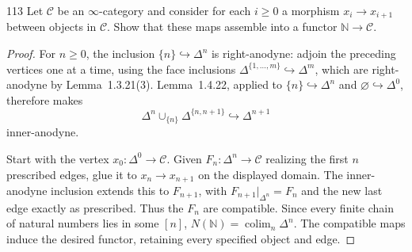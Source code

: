 \begin{exercise}{113}
Let $\mathcal C$ be an $\infty$-category and consider for each $i\ge0$ a morphism
$x_i\to x_{i+1}$ between objects in $\mathcal C$. Show that these maps assemble into a functor
$\mathbb N\to\mathcal C$.

\begin{proof}
For $n\ge0$, the inclusion $\{n\}\hookrightarrow\Delta^n$ is right-anodyne:
adjoin the preceding vertices one at a time, using the face inclusions
$\Delta^{\{1,\ldots,m\}}\hookrightarrow\Delta^m$, which are right-anodyne
by Lemma~1.3.21(3).
Lemma~1.4.22, applied to $\{n\}\hookrightarrow\Delta^n$ and
$\varnothing\hookrightarrow\Delta^0$, therefore makes
\[
 \Delta^n\cup_{\{n\}}\Delta^{\{n,n+1\}}
 \hookrightarrow\Delta^{n+1}
\]
inner-anodyne.

Start with the vertex $x_0\colon\Delta^0\to\mathcal C$.
Given $F_n\colon\Delta^n\to\mathcal C$ realizing the first $n$ prescribed
edges, glue it to $x_n\to x_{n+1}$ on the displayed domain.
The inner-anodyne inclusion extends this to $F_{n+1}$, with
$F_{n+1}|_{\Delta^n}=F_n$ and the new last edge exactly as prescribed.
Thus the $F_n$ are compatible.
Since every finite chain of natural numbers lies in some $[n]$,
$N(\mathbb N)=\operatorname{colim}_n\Delta^n$.
The compatible maps induce the desired functor, retaining every
specified object and edge.
\end{proof}
\end{exercise}
